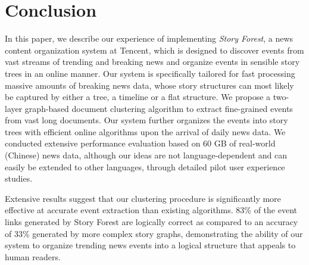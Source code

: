 \section{Conclusion}
\label{sec:conclude}

In this paper, we describe our experience of implementing \textit{Story Forest}, a news content organization system at Tencent, which is designed to discover events from vast streams of trending and breaking news and organize events in sensible story trees in an online manner. Our system is specifically tailored for fast processing massive amounts of breaking news data, whose story structures can most likely be captured by either a tree, a timeline or a flat structure.
We propose a two-layer graph-based document clustering algorithm to extract fine-grained events from vast long documents.
Our system further organizes the events into story trees with efficient online algorithms upon the arrival of daily news data. 
We conducted extensive performance evaluation based on 60 GB of real-world (Chinese) news data, although our ideas are not language-dependent and can easily be extended to other languages, through detailed pilot user experience studies.

Extensive results suggest that our clustering procedure is significantly more effective at accurate event extraction than existing algorithms. 
83\% of the event links generated by Story Forest are logically correct as compared to an accuracy of 33\% generated by more complex story graphs, demonstrating the ability of our system to organize trending news events into a logical structure that appeals to human readers.

